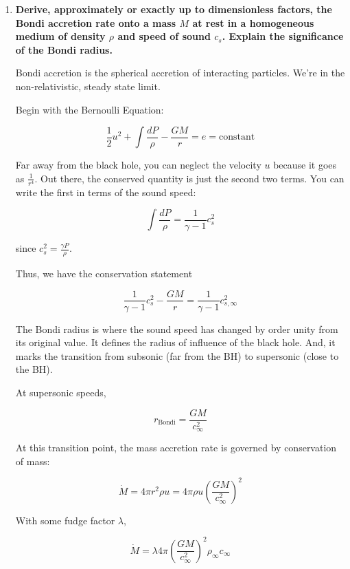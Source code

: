 \documentclass[12pt, letterpaper, preprint]{aastex}
\begin{document}
\begin{enumerate}

\item \textbf{Derive, approximately or exactly up to dimensionless factors, the Bondi accretion rate onto a mass $M$ at rest in a homogeneous medium of density $\rho$ and speed of sound $c_s$. Explain the significance of the Bondi radius.}

Bondi accretion is the spherical accretion of interacting particles. We're in the non-relativistic, steady state limit. 

Begin with the Bernoulli Equation:

\begin{equation}
\frac{1}{2} u^2 + \int \frac{dP}{\rho} - \frac{GM}{r} = e = \mathrm{constant}
\end{equation}

Far away from the black hole, you can neglect the velocity $u$ because it goes as $\frac{1}{r^4}$. Out there, the conserved quantity is just the second two terms. You can write the first in terms of the sound speed:

$$ \int \frac{dP}{\rho} = \frac{1}{\gamma-1} c_s^2 $$

since $c_s^2 = \frac{\gamma P}{\rho}$. 

Thus, we have the conservation statement

$$ \frac{1}{\gamma-1} c_s^2 - \frac{GM}{r} = \frac{1}{\gamma-1} c_{s,\infty}^2 $$

The Bondi radius is where the sound speed has changed by order unity from its original value. It defines the radius of influence of the black hole. And, it marks the transition from subsonic (far from the BH) to supersonic (close to the BH). 

At supersonic speeds, 

\begin{equation}
r_\mathrm{Bondi} = \frac{GM}{c^2_\infty}
\end{equation}

At this transition point, the mass accretion rate is governed by conservation of mass:

$$ \dot{M} = 4 \pi r^2 \rho u = 4 \pi \rho u \left(\frac{GM}{c^2_\infty}\right)^2 $$

With some fudge factor $\lambda$,

\begin{equation}
\dot{M} = \lambda 4 \pi \left(\frac{GM}{c^2_\infty}\right)^2 \rho_\infty c_\infty
\end{equation}


\end{enumerate}
\end{document}
